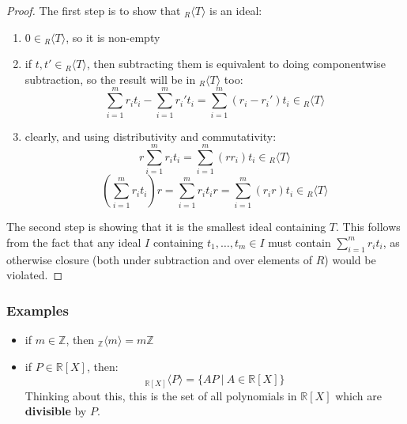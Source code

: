 \documentclass{exam}
\begin{document}

\begin{proof}

The first step is to show that ${}_R\langle T \rangle $ is an ideal:
\begin{enumerate}
    \item $0 \in {}_R\langle T \rangle$, so it is non-empty
    \item if $t,t' \in {}_R\langle T \rangle$, then subtracting them is equivalent to doing componentwise subtraction, so the result will be in ${}_R\langle T \rangle$ too:
    \[
    \sum_{i = 1}^m r_it_i - \sum_{i = 1}^m r_i't_i = \sum_{i = 1}^m (r_i - r_i')t_i \in {}_R\langle T \rangle
    \]
    \item clearly, and using distributivity and commutativity:
    \[
    r\sum_{i = 1}^m r_it_i = \sum_{i = 1}^m (rr_i)t_i \in {}_R\langle T \rangle
    \]
    \[
    \left(\sum_{i = 1}^m r_it_i\right)r = \sum_{i = 1}^m r_it_ir = \sum_{i = 1}^m (r_ir)t_i \in {}_R\langle T \rangle
    \]
\end{enumerate}

The second step is showing that it is the smallest ideal containing $T$. This follows from the fact that any ideal $I$ containing $t_1, \ldots, t_m \in I$ must contain $\sum_{i = 1}^m r_it_i$, as otherwise closure (both under subtraction and over elements of $R$) would be violated.

\end{proof}

\subsubsection{Examples}

\begin{itemize}
    \item if $m \in \mathbb{Z}$, then ${}_\mathbb{Z}\langle m \rangle = m\mathbb{Z}$
    \item if $P \in \mathbb{R}[X]$, then:
    \[
    {}_{\mathbb{R}[X]}\langle P \rangle = \{AP \ | \ A \in \mathbb{R}[X]\}
    \]
    Thinking about this, this is the set of all polynomials in $\mathbb{R}[X]$ which are \textbf{divisible} by $P$.
\end{itemize}
\end{document}
